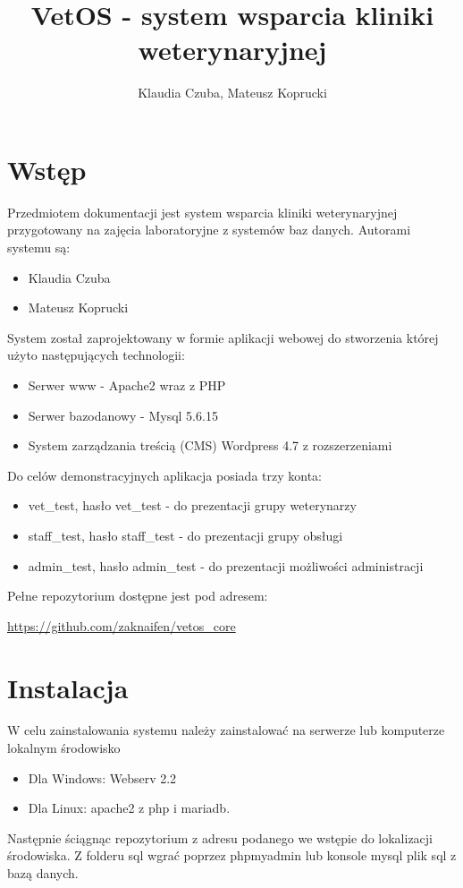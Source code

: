 \documentclass[10pt,a4paper]{article}
\author{Klaudia Czuba, Mateusz Koprucki}
\title{VetOS - system wsparcia kliniki weterynaryjnej}
\date{}
\begin{document}
	\maketitle
	\newpage
	\tableofcontents
	\newpage
	
	\section{Wstęp}
	Przedmiotem dokumentacji jest system wsparcia kliniki weterynaryjnej przygotowany na zajęcia laboratoryjne z systemów baz danych. Autorami systemu są:
		\begin{itemize}
			\item Klaudia Czuba
			\item Mateusz Koprucki
		\end{itemize}
	System został zaprojektowany w formie aplikacji webowej do stworzenia której użyto następujących technologii:
		\begin{itemize}
			\item Serwer www - Apache2 wraz z PHP
			\item Serwer bazodanowy - Mysql 5.6.15
			\item System zarządzania treścią (CMS) Wordpress 4.7 z rozszerzeniami
		\end{itemize}
\newline
	Do celów demonstracyjnych aplikacja posiada trzy konta:
		\begin{itemize}
			\item vet\_test, hasło vet\_test - do prezentacji grupy weterynarzy
			\item staff\_test, hasło staff\_test - do prezentacji grupy obsługi
			\item admin\_test, hasło  admin\_test - do prezentacji możliwości administracji
		\end{itemize}
\newline		
		Pełne repozytorium dostępne jest pod adresem: 
	
	\url{https://github.com/zaknaifen/vetos_core}
	
	\section {Instalacja}
		W celu zainstalowania systemu należy zainstalować na serwerze lub komputerze lokalnym środowisko
		\begin{itemize}
			\item Dla Windows: Webserv 2.2
			\item Dla Linux: apache2 z php i mariadb.
		\end{itemize}
	Następnie ściągnąc repozytorium z adresu podanego we wstępie do lokalizacji środowiska. Z folderu sql wgrać poprzez phpmyadmin lub konsole mysql plik sql z bazą danych. 
	
\end{document}
